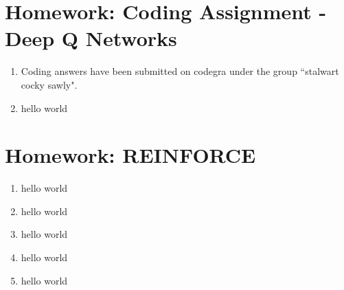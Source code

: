 \documentclass{article}
\begin{document}
\section*{Homework: Coding Assignment - Deep Q Networks}
\begin{enumerate}
	\item Coding answers have been submitted on codegra under the group ``stalwart cocky sawly".
	\item hello world
\end{enumerate}

\section*{Homework: REINFORCE}
\begin{enumerate}
	\item hello world
	\item hello world
	\item hello world
	\item hello world
	\item hello world
\end{enumerate}
\end{document}
